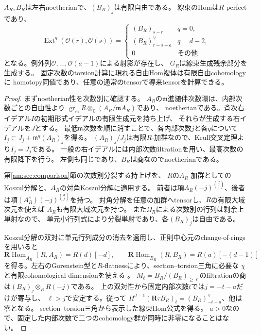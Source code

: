 \begin{lemma}[正則局所模型に必要な有限性]\label{ar:lem:regular-hom}
$A_R,B_R$は左右noetherianで、$(B_R)_j$は有限自由である。
線束のHomは$R$-perfectであり、
\[
 \operatorname{Ext}^q(\mathcal O(r),\mathcal O(s))=
 \begin{cases}(B_R)_{s-r}&q=0,\\
 (B_R)_{r-s-a}^{\vee}&q=d-2,\\
 0&\text{その他}
 \end{cases}
\]
となる。例外列$\mathcal O,\ldots,\mathcal O(a-1)$による射影が存在し、
$G_R$は線束生成残余部分を生成する。
固定次数のtorsion計算に現れる自由Hom複体は有限自由cohomologyに
homotopy同値であり、任意の通常のtensorで導来tensorを計算できる。
\end{lemma}
\begin{proof}
まずnoetherian性を次数別に確認する。
$A_R$の$\mathfrak m$進随伴次数環は、内部次数ごとの自由性より
$\operatorname{gr}_{\mathfrak m}R\otimes_{\mathbb C}(A_R/\mathfrak m A_R)$であり、
noetherianである。斉次右イデアル$I$の初期形式イデアルの有限生成元を持ち上げ、
それらが生成する右イデアルを$J$とする。
最低$\mathfrak m$次数を順に消すことで、各内部次数$j$と各$q$について
$I_j\subset J_j+\mathfrak m^q(A_R)_j$を得る。
$(A_R)_j/J_j$は有限$R$-加群なので、Krull交叉定理より$I_j=J_j$である。
一般の右イデアルには内部次数filtrationを用い、最高次数の有限降下を行う。
左側も同じであり、$B_R$は商なのでnoetherianである。

第\ref{am:sec:comparison}節の次数別分裂する持上げを、
$R$の$A_R$-加群としてのKoszul分解と、$A_R$の対角Koszul分解に適用する。
前者は項$A_R(-j)^{\binom dj}$、後者は項$(A_R^e)(-j)^{\binom dj}$を持つ。
対角分解を任意の加群へtensorし、$R$の有限大域次元を使えば
$A_R$も有限大域次元を持つ。
また$\Omega_R$による次数別の行列は剰余上単射なので、
単元小行列式により分裂単射であり、各$(B_R)_j$は自由である。

Koszul分解の双対に単元行列成分の消去を適用し、正則中心元のchange-of-ringsを用いると
\[
 \mathbf R\underline{\operatorname{Hom}}_{A_R}(R,A_R)=R(d)[-d],\qquad
 \mathbf R\underline{\operatorname{Hom}}_{B_R}(R,B_R)=R(a)[-(d-1)]
\]
を得る。左右のGorenstein型と$R$-flatnessにより、section--torsion三角に必要な
$\chi$と有限cohomological dimensionを使える
\cite[Section~4, Lemmas~6.1--6.2]{LP-BS}。
$M_\ell=B_R/(B_R)_{\ge\ell}$のfiltrationの商は$(B_R)_j\otimes_R R(-j)$である。
上の双対性から固定内部次数$t$では$j=-t-a$だけが寄与し、
$\ell>j$で安定する。従って
$H^{d-1}(\mathbf R\tau B_R)_t=(B_R)_{-t-a}^{\vee}$、他は零となる。
section--torsion三角から表示した線束Hom公式を得る。
$a>0$なので、固定した内部次数で二つのcohomology群が同時に非零になることはない。


\end{proof}
